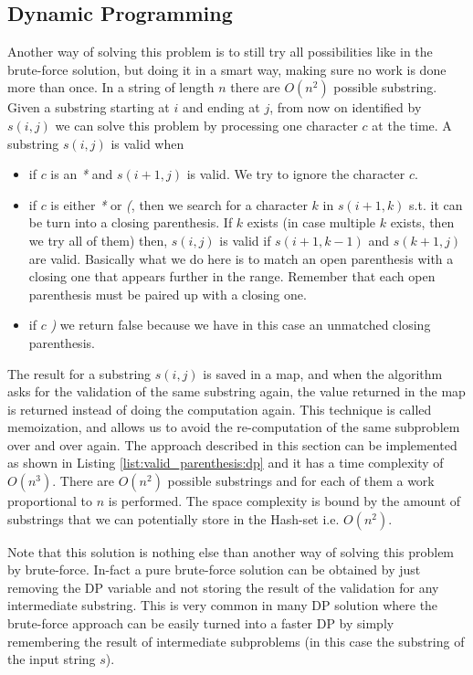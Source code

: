 

\subsection{Dynamic Programming}
\label{valid_parenthesis:sec:dp}
Another way of solving this problem is to still try all possibilities like in the brute-force solution, but doing it in a smart way, making sure no work is done more than once. In a string of length $n$ there are $O(n^2)$ possible substring. 
Given a substring starting at $i$ and ending at $j$, from now on identified by $s(i,j)$ we can solve this problem by processing one character $c$ at the time. A substring $s(i,j)$ is valid when
\begin{itemize}
	\item if $c$ is an \textit{*} and $s(i+1,j)$ is valid. We try to ignore the character $c$.
	\item if $c$ is either \textit{*} or \textit{(}, then we search for a character $k$ in $s(i+1,k)$ s.t. it can be turn into a closing parenthesis. If $k$ exists (in case multiple $k$ exists, then we try all of them) then, $s(i,j)$ is valid if $s(i+1,k-1)$ and $s(k+1,j)$ are valid. Basically what we do here is to match an open parenthesis with a closing one that appears further in the range. Remember that each open parenthesis must be paired up with a closing one.
	\item if $c$ \textit{)} we return false because we have in this case an unmatched closing parenthesis.
\end{itemize}
The result for a substring $s(i,j)$ is saved in a map, and when the algorithm asks for the validation of the same substring again, the value returned in the map is returned instead of doing the computation again. This technique is called memoization, and allows us to avoid the re-computation of the same subproblem over and over again. The approach described in this section can be implemented as shown in Listing \ref{list:valid_parenthesis:dp} and it has a time complexity of $O(n^3)$. There are $O(n^2)$ possible substrings and for each of them a work proportional to $n$ is performed. The space complexity is bound by the amount of substrings that we can potentially store in the Hash-set i.e. $O(n^2)$.

Note that this solution is nothing else than another way of solving this problem by brute-force. In-fact a pure brute-force solution can be obtained by just removing the DP variable and not storing the result of the validation for any intermediate substring.  This is very common in many DP solution where the brute-force approach can be easily turned into a faster DP by simply remembering the result of intermediate subproblems (in  this case the substring of the input string $s$). 

